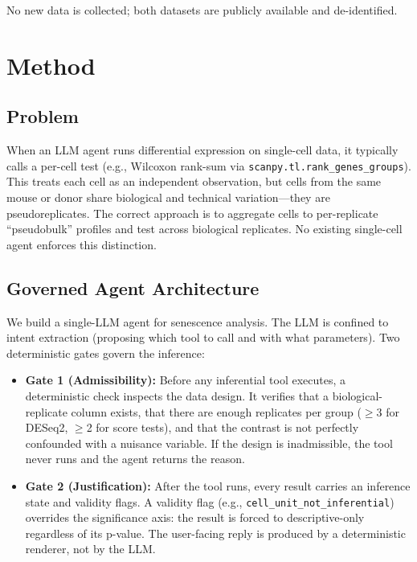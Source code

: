 \documentclass[11pt]{article}
\begin{document}
No new data is collected; both datasets are publicly available and
de-identified.

\section{Method}

\subsection{Problem}

When an LLM agent runs differential expression on single-cell data, it
typically calls a per-cell test (e.g., Wilcoxon rank-sum via
\texttt{scanpy.tl.rank\_genes\_groups}). This treats each cell as an
independent observation, but cells from the same mouse or donor share
biological and technical variation---they are pseudoreplicates. The correct
approach is to aggregate cells to per-replicate ``pseudobulk'' profiles and
test across biological replicates. No existing single-cell agent enforces this
distinction.

\subsection{Governed Agent Architecture}

We build a single-LLM agent for senescence analysis. The LLM is confined to
intent extraction (proposing which tool to call and with what parameters). Two
deterministic gates govern the inference:

\begin{itemize}
  \item \textbf{Gate 1 (Admissibility):} Before any inferential tool executes,
  a deterministic check inspects the data design. It verifies that a
  biological-replicate column exists, that there are enough replicates per
  group ($\geq$3 for DESeq2, $\geq$2 for score tests), and that the contrast
  is not perfectly confounded with a nuisance variable. If the design is
  inadmissible, the tool never runs and the agent returns the reason.

  \item \textbf{Gate 2 (Justification):} After the tool runs, every result
  carries an inference state and validity flags. A validity flag (e.g.,
  \texttt{cell\_unit\_not\_inferential}) overrides the significance axis: the
  result is forced to descriptive-only regardless of its p-value. The
  user-facing reply is produced by a deterministic renderer, not by the LLM.
\end{itemize}
\end{document}
